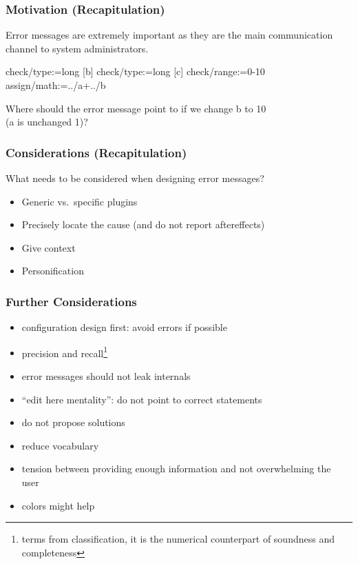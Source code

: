 \begin{frame}[fragile]
	\frametitle{Motivation (Recapitulation)}

	Error messages are extremely important as they are the main communication channel to system administrators.\\
	\vspace{0.5em}

	\begin{code}[morekeywords={assign,math},gobble=4]
	[a]
	  check/type:=long
	[b]
	  check/type:=long
	[c]
	  check/range:=0-10
	  assign/math:=../a+../b
	\end{code}

	\begin{task}
	Where should the error message point to if we change b to 10 \\ (a is unchanged 1)?
	\end{task}
\end{frame}

\begin{frame}
	\frametitle{Considerations (Recapitulation)}

	\begin{task}
	What needs to be considered when designing error messages?
	\end{task}

	\begin{itemize} %
	\item Generic vs.\ specific plugins
	\item Precisely locate the cause (and do not report aftereffects)
	\item Give context
	\item Personification~\cite{lee2011personifying}
	\end{itemize}
\end{frame}

\begin{frame}
	\frametitle{Further Considerations}

	\begin{itemize}[<+-| alert@+>]
	\item configuration design first: avoid errors if possible
	\item precision and recall\footnote{terms from classification, it is the numerical counterpart of soundness and completeness}~\cite{wrenn2017error}
	\item error messages should not leak internals~\cite{brown1983error}
	\item ``edit here mentality'': do not point to correct statements~\cite{marceau2011mind}
	\item do not propose solutions~\cite{marceau2011mind}
	\item reduce vocabulary~\cite{marceau2011mind}
	\item tension between providing enough information and not overwhelming the user~\cite{wrenn2017error}
	\item colors might help~\cite{wrenn2017error}
	\end{itemize}
\end{frame}

